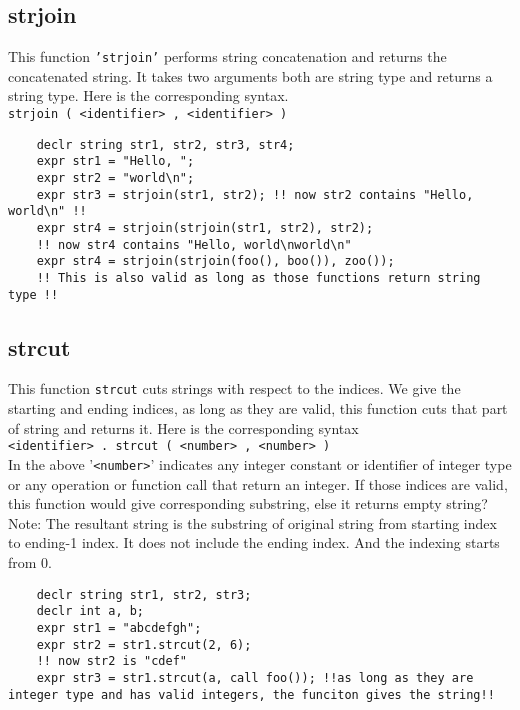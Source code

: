 \documentclass[journal, 18pt]{report}
\begin{document}
\subsection{strjoin}
This function \texttt{'strjoin'} performs string concatenation and returns the concatenated string. It takes two arguments both are string type and returns a string type. Here is the corresponding syntax.\\
\texttt{strjoin ( <identifier> , <identifier> )}
\begin{lstlisting}
    declr string str1, str2, str3, str4;
    expr str1 = "Hello, ";
    expr str2 = "world\n";
    expr str3 = strjoin(str1, str2); !! now str2 contains "Hello, world\n" !!
    expr str4 = strjoin(strjoin(str1, str2), str2); 
    !! now str4 contains "Hello, world\nworld\n"
    expr str4 = strjoin(strjoin(foo(), boo()), zoo()); 
    !! This is also valid as long as those functions return string type !!
\end{lstlisting}

\subsection{strcut}
This function \texttt{strcut} cuts strings with respect to the indices. We give the starting and ending indices, as long as they are valid, this function cuts that part of string and returns it. Here is the corresponding syntax\\
\texttt{<identifier> . strcut ( <number> , <number> ) } \\
In the above '\texttt{<number>}' indicates any integer constant or identifier of integer type or any operation or function call that return an integer. If those indices are valid, this function would give corresponding substring, else it returns empty string? \\
Note: The resultant string is the substring of original string from starting index to ending-1 index. It does not include the ending index. And the indexing starts from 0.
\begin{lstlisting}
    declr string str1, str2, str3;
    declr int a, b;
    expr str1 = "abcdefgh";
    expr str2 = str1.strcut(2, 6);
    !! now str2 is "cdef"
    expr str3 = str1.strcut(a, call foo()); !!as long as they are integer type and has valid integers, the funciton gives the string!!
\end{lstlisting}
\end{document}
